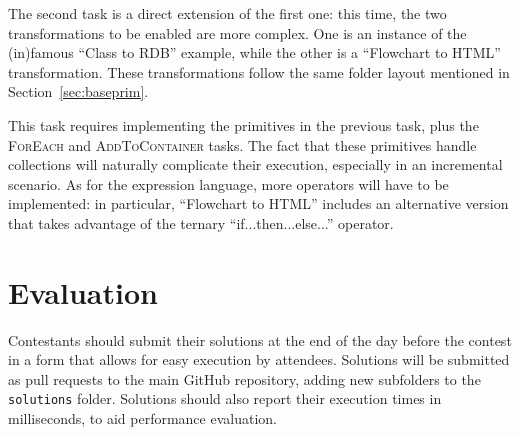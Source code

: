 \documentclass[a4paper]{scrartcl}
\newcommand*{\class}[1]{\textsc{#1}}
\newcommand*{\file}[1]{\texttt{#1}}
\begin{document}

The second task is a direct extension of the first one: this time, the
two transformations to be enabled are more complex. One is an instance
of the (in)famous ``Class to RDB'' example, while the other is a
``Flowchart to HTML'' transformation. These transformations follow the
same folder layout mentioned in Section~\ref{sec:baseprim}.

This task requires implementing the primitives in the previous task,
plus the \class{ForEach} and \class{AddToContainer} tasks. The fact
that these primitives handle collections will naturally complicate
their execution, especially in an incremental scenario. As for the
expression language, more operators will have to be implemented: in
particular, ``Flowchart to HTML'' includes an alternative version that
takes advantage of the ternary ``if...then...else...'' operator.

\section{Evaluation}
\label{sec:eval}

Contestants should submit their solutions at the end of the day before
the contest in a form that allows for easy execution by
attendees. Solutions will be submitted as pull requests to the main
GitHub repository, adding new subfolders to the \file{solutions}
folder. Solutions should also report their execution times in
milliseconds, to aid performance evaluation.
\end{document}
